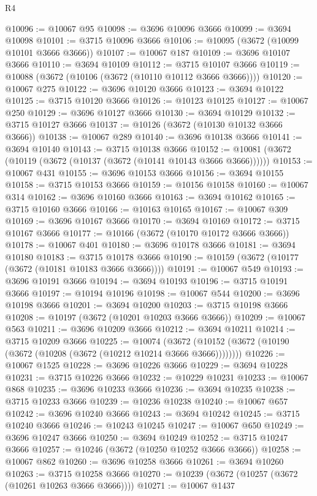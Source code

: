 \begin{lexlean}{R4}
\begin{coremodule}
@10096 := @10067 @95
@10098 := @3696 @10096 @3666
@10099 := @3694 @10098
@10101 := @3715 @10096 @3666
@10106 := @10095 (@3672 (@10099 @10101 @3666 @3666))
@10107 := @10067 @187
@10109 := @3696 @10107 @3666
@10110 := @3694 @10109
@10112 := @3715 @10107 @3666
@10119 := @10088 (@3672 (@10106 (@3672 (@10110 @10112 @3666 @3666))))
@10120 := @10067 @275
@10122 := @3696 @10120 @3666
@10123 := @3694 @10122
@10125 := @3715 @10120 @3666
@10126 := @10123 @10125
@10127 := @10067 @250
@10129 := @3696 @10127 @3666
@10130 := @3694 @10129
@10132 := @3715 @10127 @3666
@10137 := @10126 (@3672 (@10130 @10132 @3666 @3666))
@10138 := @10067 @289
@10140 := @3696 @10138 @3666
@10141 := @3694 @10140
@10143 := @3715 @10138 @3666
@10152 := @10081 (@3672 (@10119 (@3672 (@10137 (@3672 (@10141 @10143 @3666 @3666))))))
@10153 := @10067 @431
@10155 := @3696 @10153 @3666
@10156 := @3694 @10155
@10158 := @3715 @10153 @3666
@10159 := @10156 @10158
@10160 := @10067 @314
@10162 := @3696 @10160 @3666
@10163 := @3694 @10162
@10165 := @3715 @10160 @3666
@10166 := @10163 @10165
@10167 := @10067 @309
@10169 := @3696 @10167 @3666
@10170 := @3694 @10169
@10172 := @3715 @10167 @3666
@10177 := @10166 (@3672 (@10170 @10172 @3666 @3666))
@10178 := @10067 @401
@10180 := @3696 @10178 @3666
@10181 := @3694 @10180
@10183 := @3715 @10178 @3666
@10190 := @10159 (@3672 (@10177 (@3672 (@10181 @10183 @3666 @3666))))
@10191 := @10067 @549
@10193 := @3696 @10191 @3666
@10194 := @3694 @10193
@10196 := @3715 @10191 @3666
@10197 := @10194 @10196
@10198 := @10067 @544
@10200 := @3696 @10198 @3666
@10201 := @3694 @10200
@10203 := @3715 @10198 @3666
@10208 := @10197 (@3672 (@10201 @10203 @3666 @3666))
@10209 := @10067 @563
@10211 := @3696 @10209 @3666
@10212 := @3694 @10211
@10214 := @3715 @10209 @3666
@10225 := @10074
    (@3672 (@10152 (@3672 (@10190 (@3672 (@10208 (@3672 (@10212 @10214 @3666 @3666))))))))
@10226 := @10067 @1525
@10228 := @3696 @10226 @3666
@10229 := @3694 @10228
@10231 := @3715 @10226 @3666
@10232 := @10229 @10231
@10233 := @10067 @868
@10235 := @3696 @10233 @3666
@10236 := @3694 @10235
@10238 := @3715 @10233 @3666
@10239 := @10236 @10238
@10240 := @10067 @657
@10242 := @3696 @10240 @3666
@10243 := @3694 @10242
@10245 := @3715 @10240 @3666
@10246 := @10243 @10245
@10247 := @10067 @650
@10249 := @3696 @10247 @3666
@10250 := @3694 @10249
@10252 := @3715 @10247 @3666
@10257 := @10246 (@3672 (@10250 @10252 @3666 @3666))
@10258 := @10067 @862
@10260 := @3696 @10258 @3666
@10261 := @3694 @10260
@10263 := @3715 @10258 @3666
@10270 := @10239 (@3672 (@10257 (@3672 (@10261 @10263 @3666 @3666))))
@10271 := @10067 @1437

\end{coremodule}
\end{lexlean}
